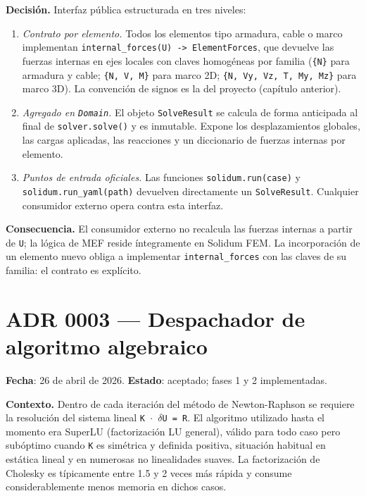 \documentclass[11pt,oneside]{report}
\begin{document}
\textbf{Decisión.} Interfaz pública estructurada en tres niveles:

\begin{enumerate}
  \item \textit{Contrato por elemento.} Todos los elementos tipo armadura, cable o marco implementan \texttt{internal\_\allowbreak{}forces(U) -\textgreater{} ElementForces}, que devuelve las fuerzas internas en ejes locales con claves homogéneas por familia (\texttt{\{N\}} para armadura y cable; \texttt{\{N, V, M\}} para marco 2D; \texttt{\{N, Vy, Vz, T, My, Mz\}} para marco 3D). La convención de signos es la del proyecto (capítulo anterior).
  \item \textit{Agregado en \texttt{Domain}.} El objeto \texttt{SolveResult} se calcula de forma anticipada al final de \texttt{solver.solve()} y es inmutable. Expone los desplazamientos globales, las cargas aplicadas, las reacciones y un diccionario de fuerzas internas por elemento.
  \item \textit{Puntos de entrada oficiales.} Las funciones \texttt{solidum.\allowbreak{}run(case)} y \texttt{solidum.\allowbreak{}run\_\allowbreak{}yaml(path)} devuelven directamente un \texttt{SolveResult}. Cualquier consumidor externo opera contra esta interfaz.
\end{enumerate}

\textbf{Consecuencia.} El consumidor externo no recalcula las fuerzas internas a partir de \texttt{U}; la lógica de MEF reside íntegramente en Solidum FEM. La incorporación de un elemento nuevo obliga a implementar \texttt{internal\_forces} con las claves de su familia: el contrato es explícito.

\section{ADR 0003 --- Despachador de algoritmo algebraico}
\label{adr:0003}

\textbf{Fecha}: 26 de abril de 2026. \textbf{Estado}: aceptado; fases 1 y 2 implementadas.

\textbf{Contexto.} Dentro de cada iteración del método de Newton-Raphson se requiere la resolución del sistema lineal \texttt{K \ensuremath{\cdot} \ensuremath{\delta}U = R}. El algoritmo utilizado hasta el momento era SuperLU (factorización LU general), válido para todo caso pero subóptimo cuando \texttt{K} es simétrica y definida positiva, situación habitual en estática lineal y en numerosas no linealidades suaves. La factorización de Cholesky es típicamente entre 1.5 y 2 veces más rápida y consume considerablemente menos memoria en dichos casos.
\end{document}
